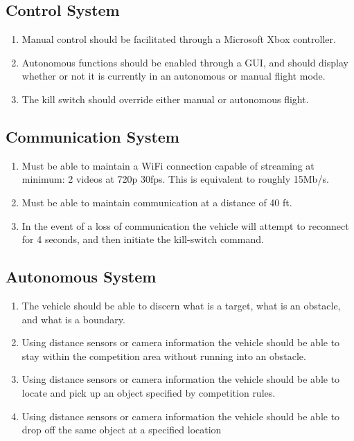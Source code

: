 \documentclass[letterpaper, 10, draftclsnofoot, onecolumn]{IEEEtran}
\begin{document}
\subsection{Control System}
\begin{enumerate}
\item Manual control should be facilitated through a Microsoft Xbox controller. 

\item Autonomous functions should be enabled through a GUI, and should display whether or not it is currently in an autonomous or manual flight mode. 

\item The kill switch should override either manual or autonomous flight.


\end{enumerate}
\subsection{Communication System}
\begin{enumerate}
\item Must be able to maintain a WiFi connection capable of streaming at minimum: 2 videos at 720p 30fps. This is equivalent to roughly 15Mb/s.

\item Must be able to maintain communication at a distance of 40 ft.

\item In the event of a loss of communication the vehicle will attempt to reconnect for 4 seconds, and then initiate the kill-switch command.


\end{enumerate}
\subsection{Autonomous System}
\begin{enumerate}
\item The vehicle should be able to discern what is a target, what is an obstacle, and what is a boundary.
\item Using distance sensors or camera information the vehicle should be able to stay within the competition area without running into an obstacle. 
\item Using distance sensors or camera information the vehicle should be able to locate and pick up an object specified by competition rules.
\item Using distance sensors or camera information the vehicle should be able to drop off the same object at a specified location


\end{enumerate}
\end{document}
